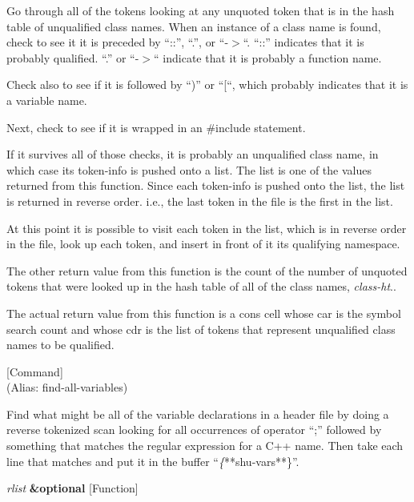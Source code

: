 \begin{doc-string}
Go through all of the tokens looking at any unquoted token that is in the
hash table of unqualified class names.  When an instance of a class name is
found, check to see it it is preceded by ``::'', ``.'', or ``-$>$``.  ``::''
indicates that it is probably qualified.  ``.'' or ``-$>$`` indicate that it is
probably a function name.

Check also to see if it is followed by ``)'' or ``[``, which probably indicates
that it is a variable name.

Next, check to see if it is wrapped in an \#include statement.

If it survives all of those checks, it is probably an unqualified class name, in
which case its token-info is pushed onto a list.  The list is one of the values
returned from this function.  Since each token-info is pushed onto the list, the
list is returned in reverse order.  i.e., the last token in the file is the
first in the list.

At this point it is possible to visit each token in the list, which is in
reverse order in the file, look up each token, and insert in front of it its
qualifying namespace.

The other return value from this function is the count of the number of unquoted
tokens that were looked up in the hash table of all of the class names,
\emph{class-ht}..

The actual return value from this function is a cons cell whose car is the
symbol search count and whose cdr is the list of tokens that represent
unqualified class names to be qualified.
\end{doc-string}

\vspace{1em}
\noindent
{}
\usebox{\funcname}
 \hfill [Command]\\%
 (Alias: find-all-variables)

\begin{doc-string}
Find what might be all of the variable declarations in a header file by doing
a reverse tokenized scan looking for all occurrences of operator ``;'' followed
by something that matches the regular expression for a C++ name.  Then take each
line that matches and put it in the buffer ``\emph\{**shu-vars**\}''.
\end{doc-string}

\vspace{1em}
\noindent
{}
\usebox{\funcname}\emph{rlist} \textbf{\&optional}
 \hfill [Function]
\hspace*{\wd\funcname}

